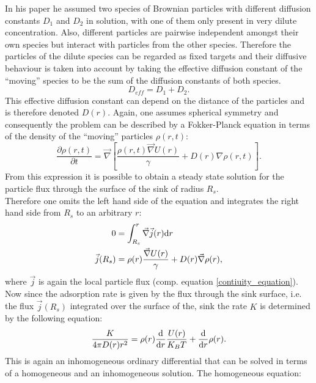 In his paper he assumed two species of Brownian particles with different diffusion constants $D_{1}$ and $D_{2}$ in solution, with one of them only present in very dilute concentration. Also, different particles are pairwise independent amongst their own species but interact with particles from the other species. Therefore the particles of the dilute species can be regarded as fixed targets and their diffusive behaviour is taken into account by taking the effective diffusion constant of the ``moving'' species to be the sum of the diffusion constants of both species. 
\begin{equation}
    D_{eff} = D_{1} + D_{2}.
\end{equation}
This effective diffusion constant can depend on the distance of the particles and is therefore denoted $D(r)$.
Again, one assumes spherical symmetry and consequently the problem can be described by a Fokker-Planck equation in terms of the density of the ``moving'' particles $\rho(r,t)$:
\begin{equation}
    \frac{\partial \rho(r,t)}{\partial t} = \vec \nabla \left[ \frac{\rho(r,t)\vec \nabla U(r)}{\gamma} + D(r) \nabla \rho(r,t) \right].
    \label{fpe_debye}
\end{equation}
From this expression it is possible to obtain a steady state solution for the particle flux through the surface of the sink of radius $R_s$. \\
Therefore one omits the left hand side of the equation and integrates the right hand side from $R_s$ to an arbitrary $r$:
\begin{align}
    0 &= \int_{R_s}^{r} \vec \nabla \vec j(r) {\rm d} r\nonumber \\
    \vec j(R_s) &=  \rho(r)\frac{\vec \nabla U(r)}{\gamma} + D(r) \vec \nabla \rho(r),
\end{align}
where $\vec{j}$ is again the local particle flux (comp. equation \eqref{contiuity_equation}).\\ Now since the adsorption rate is given by the flux through the sink surface, i.e. the flux $\vec j (R_s)$ integrated over the surface of the, sink the rate $K$ is determined by the following equation:
\begin{equation}
    \frac{K}{4\pi D(r) r^{2}} = \rho(r)\frac{\rm d}{ {\rm d}r} \frac{U(r)}{K_B T} + \frac{\rm d}{ {\rm d}r} \rho(r).
    \label{K}
\end{equation}
This is again an inhomogeneous ordinary differential that can be solved in terms of a homogeneous and an inhomogeneous solution. The homogeneous equation:
